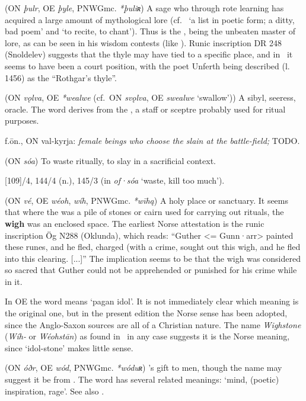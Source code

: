 \begin{itemize}
 (ON \emph{þulr}, OE \emph{þyle}, PNWGmc. \emph{*þuliʀ})
  A sage who through rote learning has acquired a large amount of mythological lore (cf.~ ‘a list in poetic form; a ditty, bad poem’ and  ‘to recite, to chant’).  Thus  is the , being the unbeaten master of lore, as can be seen in his wisdom contests (like ).  Runic inscription DR 248 (Snoldelev) suggests that the thyle may have tied to a specific place, and in \Beowulf\ it seems to have been a court position, with the poet Unferth being described (l. 1456) as the “Rothgar’s thyle”.

 (ON \emph{vǫlva}, OE \emph{*wealwe} (cf.~ON \emph{svǫlva}, OE \emph{swealwe} ‘swallow’))
  A sibyl, seeress, oracle.  The word derives from the , a staff or sceptre probably used for ritual purposes.

 f.ōn., ON val-kyrja:
  \emph{female beings who choose the slain at the battle-field;} TODO.

 (ON \emph{sóa})
  To waste ritually, to slay in a sacrificial context.

  [109]/4, 144/4 (n.), 145/3 (in \emph{of·sóa} ‘waste, kill too much’).

 (ON \emph{vé}, OE \emph{wéoh}, \emph{wíh}, PNWGmc. \emph{*wīhą})
  A holy place or sanctuary. It seems that where the  was a pile of stones or cairn used for carrying out rituals, the \textbf{wigh} was an enclosed space. The earliest Norse attestation is the runic inscription Ög N288 (Oklunda), which reads: “Guther <= Gunn·arr> painted these runes, and he fled, charged (with a crime, sought out this wigh, and he fled into this clearing. [...]” The implication seems to be that the wigh was considered so sacred that Guther could not be apprehended or punished for his crime while in it.

  In OE the word means ‘pagan idol’. It is not immediately clear which meaning is the original one, but in the present edition the Norse sense has been adopted, since the Anglo-Saxon sources are all of a Christian nature.  The name \emph{Wighstone} (\emph{Wíh-} or \emph{Wéohstān}) as found in \Beowulf\ in any case suggests it is the Norse meaning, since ‘idol-stone’ makes little sense.

 (ON \emph{óðr}, OE \emph{wód}, PNWGmc. \emph{*wóduʀ})
  ’s gift to men, though the name may suggest it be from . The word has several related meanings: ‘mind, (poetic) inspiration, rage’. See also .


\end{itemize}
